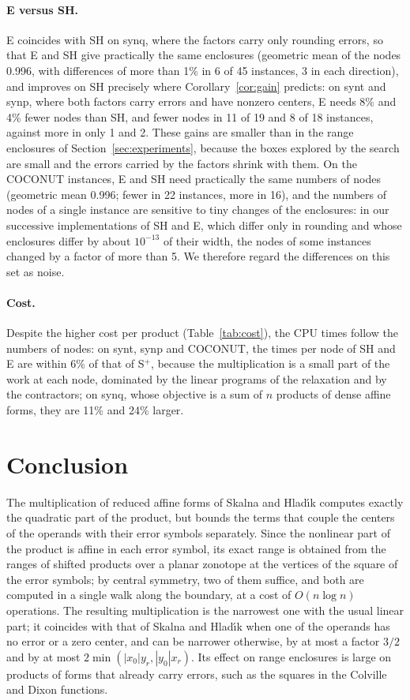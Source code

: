 \documentclass[10pt]{article}
\theoremstyle{definition}
\begin{document}
\paragraph{E versus SH.} E coincides with SH on synq, where the factors carry only rounding errors, so that E and SH give practically the same enclosures (geometric mean of the nodes 0.996, with differences of more than 1\% in 6 of 45 instances, 3 in each direction), and improves on SH precisely where Corollary~\ref{cor:gain} predicts: on synt and synp, where both factors carry errors and have nonzero centers, E needs 8\% and 4\% fewer nodes than SH, and fewer nodes in 11 of 19 and 8 of 18 instances, against more in only 1 and 2. These gains are smaller than in the range enclosures of Section~\ref{sec:experiments}, because the boxes explored by the search are small and the errors carried by the factors shrink with them. On the COCONUT instances, E and SH need practically the same numbers of nodes (geometric mean 0.996; fewer in 22 instances, more in 16), and the numbers of nodes of a single instance are sensitive to tiny changes of the enclosures: in our successive implementations of SH and E, which differ only in rounding and whose enclosures differ by about $10^{-13}$ of their width, the nodes of some instances changed by a factor of more than 5. We therefore regard the differences on this set as noise.

\paragraph{Cost.} Despite the higher cost per product (Table~\ref{tab:cost}), the CPU times follow the numbers of nodes: on synt, synp and COCONUT, the times per node of SH and E are within 6\% of that of S$^+$, because the multiplication is a small part of the work at each node, dominated by the linear programs of the relaxation and by the contractors; on synq, whose objective is a sum of $n$ products of dense affine forms, they are 11\% and 24\% larger.


\section{Conclusion}

The multiplication of reduced affine forms of Skalna and Hlad\'{\i}k computes exactly the quadratic part of the product, but bounds the terms that couple the centers of the operands with their error symbols separately. Since the nonlinear part of the product is affine in each error symbol, its exact range is obtained from the ranges of shifted products over a planar zonotope at the vertices of the square of the error symbols; by central symmetry, two of them suffice, and both are computed in a single walk along the boundary, at a cost of $O(n\log n)$ operations. The resulting multiplication is the narrowest one with the usual linear part; it coincides with that of Skalna and Hlad\'{\i}k when one of the operands has no error or a zero center, and can be narrower otherwise, by at most a factor $3/2$ and by at most $2\min(|x_0|y_r,|y_0|x_r)$. Its effect on range enclosures is large on products of forms that already carry errors, such as the squares in the Colville and Dixon functions.
\end{document}
